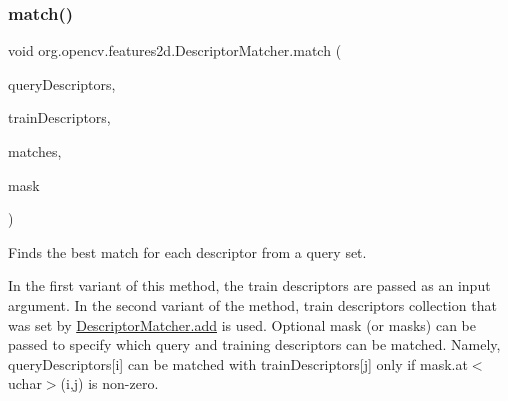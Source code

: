 \subsubsection{\texorpdfstring{match()}{match()}\hspace{0.1cm}{\footnotesize\ttfamily [1/4]}}
{\footnotesize\ttfamily void org.\+opencv.\+features2d.\+Descriptor\+Matcher.\+match (\begin{DoxyParamCaption}\item[{\mbox{\hyperlink{classorg_1_1opencv_1_1core_1_1_mat}{Mat}}}]{query\+Descriptors,  }\item[{\mbox{\hyperlink{classorg_1_1opencv_1_1core_1_1_mat}{Mat}}}]{train\+Descriptors,  }\item[{\mbox{\hyperlink{classorg_1_1opencv_1_1core_1_1_mat_of_d_match}{Mat\+Of\+D\+Match}}}]{matches,  }\item[{\mbox{\hyperlink{classorg_1_1opencv_1_1core_1_1_mat}{Mat}}}]{mask }\end{DoxyParamCaption})}

Finds the best match for each descriptor from a query set.

In the first variant of this method, the train descriptors are passed as an input argument. In the second variant of the method, train descriptors collection that was set by {\ttfamily \mbox{\hyperlink{classorg_1_1opencv_1_1features2d_1_1_descriptor_matcher_aae08a476f7626406fb238bd32b28d1a3}{Descriptor\+Matcher.\+add}}} is used. Optional mask (or masks) can be passed to specify which query and training descriptors can be matched. Namely, {\ttfamily query\+Descriptors\mbox{[}i\mbox{]}} can be matched with {\ttfamily train\+Descriptors\mbox{[}j\mbox{]}} only if {\ttfamily mask.\+at$<$uchar$>$(i,j)} is non-\/zero.


